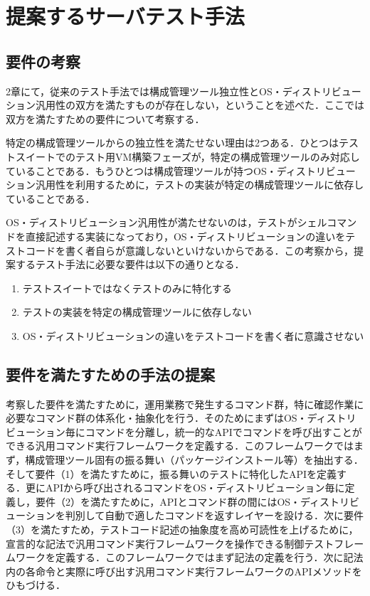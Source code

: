 \section{提案するサーバテスト手法}

\subsection{要件の考察}

2章にて，従来のテスト手法では構成管理ツール独立性とOS・ディストリビューション汎用性の双方を満たすものが存在しない，ということを述べた．ここでは双方を満たすための要件について考察する．

特定の構成管理ツールからの独立性を満たせない理由は2つある．ひとつはテストスイートでのテスト用VM構築フェーズが，特定の構成管理ツールのみ対応していることである．もうひとつは構成管理ツールが持つOS・ディストリビューション汎用性を利用するために，テストの実装が特定の構成管理ツールに依存していることである．

OS・ディストリビューション汎用性が満たせないのは，テストがシェルコマンドを直接記述する実装になっており，OS・ディストリビューションの違いをテストコードを書く者自らが意識しないといけないからである．この考察から，提案するテスト手法に必要な要件は以下の通りとなる．

\begin{enumerate}
  \item テストスイートではなくテストのみに特化する
  \item テストの実装を特定の構成管理ツールに依存しない
  \item OS・ディストリビューションの違いをテストコードを書く者に意識させない
\end{enumerate}

\subsection{要件を満たすための手法の提案}

考察した要件を満たすために，運用業務で発生するコマンド群，特に確認作業に必要なコマンド群の体系化・抽象化を行う．そのためにまずはOS・ディストリビューション毎にコマンドを分離し，統一的なAPIでコマンドを呼び出すことができる汎用コマンド実行フレームワークを定義する．このフレームワークではまず，構成管理ツール固有の振る舞い（パッケージインストール等）を抽出する．そして要件（1）を満たすために，振る舞いのテストに特化したAPIを定義する．更にAPIから呼び出されるコマンドをOS・ディストリビューション毎に定義し，要件（2）を満たすために，APIとコマンド群の間にはOS・ディストリビューションを判別して自動で適したコマンドを返すレイヤーを設ける．次に要件（3）を満たすため，テストコード記述の抽象度を高め可読性を上げるために，宣言的な記法で汎用コマンド実行フレームワークを操作できる制御テストフレームワークを定義する．このフレームワークではまず記法の定義を行う．次に記法内の各命令と実際に呼び出す汎用コマンド実行フレームワークのAPIメソッドをひもづける．

